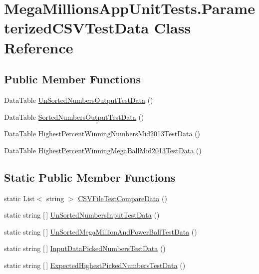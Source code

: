 \hypertarget{class_mega_millions_app_unit_tests_1_1_parameterized_c_s_v_test_data}{}\section{Mega\+Millions\+App\+Unit\+Tests.\+Parameterized\+C\+S\+V\+Test\+Data Class Reference}
\label{class_mega_millions_app_unit_tests_1_1_parameterized_c_s_v_test_data}
\subsection*{Public Member Functions}
\begin{DoxyCompactItemize}
\item 
Data\+Table \hyperlink{class_mega_millions_app_unit_tests_1_1_parameterized_c_s_v_test_data_a9be3d19a28755e128eeefd979702f235}{Un\+Sorted\+Numbers\+Output\+Test\+Data} ()
\item 
Data\+Table \hyperlink{class_mega_millions_app_unit_tests_1_1_parameterized_c_s_v_test_data_a1c8fd2f73965f08f4aaba08c16287b14}{Sorted\+Numbers\+Output\+Test\+Data} ()
\item 
Data\+Table \hyperlink{class_mega_millions_app_unit_tests_1_1_parameterized_c_s_v_test_data_a90ca0ea5ddb894cd55197e210dc91c42}{Highest\+Percent\+Winning\+Numbers\+Mid2013\+Test\+Data} ()
\item 
Data\+Table \hyperlink{class_mega_millions_app_unit_tests_1_1_parameterized_c_s_v_test_data_a3dd0781a257ea7040f3b8a6b48a4ec3f}{Highest\+Percent\+Winning\+Mega\+Ball\+Mid2013\+Test\+Data} ()
\end{DoxyCompactItemize}
\subsection*{Static Public Member Functions}
\begin{DoxyCompactItemize}
\item 
static List$<$ string $>$ \hyperlink{class_mega_millions_app_unit_tests_1_1_parameterized_c_s_v_test_data_af28937fd63dff20ad81c48d23185b99d}{C\+S\+V\+File\+Test\+Compare\+Data} ()
\item 
static string \mbox{[}$\,$\mbox{]} \hyperlink{class_mega_millions_app_unit_tests_1_1_parameterized_c_s_v_test_data_acf41c3a18bbf2ae4eeeabcb857a03032}{Un\+Sorted\+Numbers\+Input\+Test\+Data} ()
\item 
static string \mbox{[}$\,$\mbox{]} \hyperlink{class_mega_millions_app_unit_tests_1_1_parameterized_c_s_v_test_data_a700d7c092e5bd715ef0064b7fb471e95}{Un\+Sorted\+Mega\+Million\+And\+Power\+Ball\+Test\+Data} ()
\item 
static string \mbox{[}$\,$\mbox{]} \hyperlink{class_mega_millions_app_unit_tests_1_1_parameterized_c_s_v_test_data_ad2bff6a4fb44993c469e81d6b379a416}{Input\+Data\+Picked\+Numbers\+Test\+Data} ()
\item 
static string \mbox{[}$\,$\mbox{]} \hyperlink{class_mega_millions_app_unit_tests_1_1_parameterized_c_s_v_test_data_a287ccc1a4bb83155695218b0ca38f43a}{Expected\+Highest\+Picked\+Numbers\+Test\+Data} ()
\end{DoxyCompactItemize}


